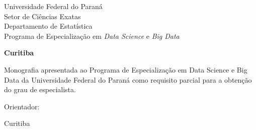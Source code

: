 \onecolumn
\thispagestyle{empty}
\begin{center}
  \linespread{1.25}
  \sffamily

  {\LARGE
    Universidade Federal do Paraná\\
    Setor de Ciências Exatas\\
    Departamento de Estatística\\
    Programa de Especialização em \emph{Data Science} e \emph{Big Data}\\
    \par
  }

  \vspace{4em}

  {\Large \capaautor}

  \vspace{21em}

  \begin{minipage}{0.9\linewidth}
    \begin{center}
      {\huge\bfseries \capatitulo\par}
    \end{center}
  \end{minipage}

  \vfill
  {\Large\bfseries
    Curitiba\\
    \capaano\par
  }

\end{center}
\newpage

\thispagestyle{empty}
\begin{center}
  \linespread{1.25}
  \sffamily

  {\Large \capaautor}

  \vspace{21em}

  \begin{minipage}{0.9\linewidth}
    \begin{center}
      {\LARGE\bfseries \capatitulo\par}
    \end{center}
  \end{minipage}

  \vspace{11em}

  \hfill
  \begin{minipage}{0.5\linewidth}
    \linespread{1.1}
    \large\rmfamily

    Monografia apresentada ao Programa de Especialização em Data Science
    e Big Data da Universidade Federal do Paraná como requisito
    parcial para a obtenção do grau de especialista.
    \newline

    Orientador: \capaorientador

  \end{minipage}

  \vfill
  {\Large\rmfamily
    Curitiba\\
    \capaano\par
  }

\end{center}
\newpage
